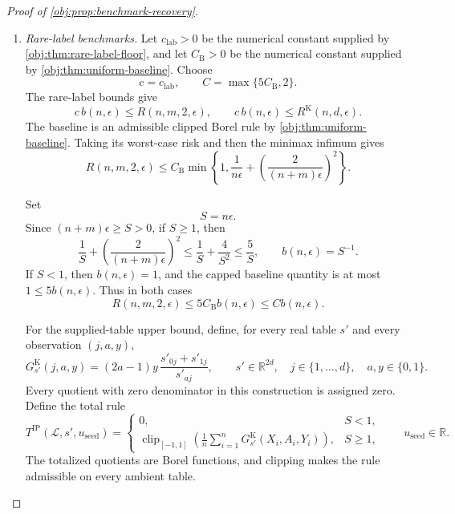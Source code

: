 \documentclass[11pt]{article}
\begin{document}
\begin{proof}[Proof of \cref{obj:prop:benchmark-recovery}]
\begin{enumerate}
\item \emph{Rare-label benchmarks.}
Let \(c_{\mathrm{lab}}>0\) be the numerical constant supplied by
\cref{obj:thm:rare-label-floor}, and let \(C_{\mathrm B}>0\) be the numerical constant supplied by \cref{obj:thm:uniform-baseline}. Choose
\[
c=c_{\mathrm{lab}},
\qquad
C=\max\{5C_{\mathrm B},2\}.
\]
The rare-label bounds give
\[
c\,b(n,\epsilon)\le R(n,m,2,\epsilon),
\qquad
c\,b(n,\epsilon)\le R^{\mathrm K}(n,d,\epsilon).
\]
The baseline is an admissible clipped Borel rule by
\cref{obj:thm:uniform-baseline}. Taking its worst-case risk and then the minimax infimum gives
\[
R(n,m,2,\epsilon)
\le
C_{\mathrm B}\min\left\{
1,\frac1{n\epsilon}
+\left(\frac2{(n+m)\epsilon}\right)^2
\right\}.
\]

Set
\[
S=n\epsilon.
\]
Since \((n+m)\epsilon\ge S>0\), if \(S\ge1\), then
\[
\frac1S+\left(\frac2{(n+m)\epsilon}\right)^2
\le\frac1S+\frac4{S^2}
\le\frac5S,
\qquad
b(n,\epsilon)=S^{-1}.
\]
If \(S<1\), then \(b(n,\epsilon)=1\), and the capped baseline quantity is at most \(1\le5b(n,\epsilon)\). Thus in both cases
\[
R(n,m,2,\epsilon)
\le5C_{\mathrm B}b(n,\epsilon)
\le Cb(n,\epsilon).
\]

For the supplied-table upper bound, define, for every real table \(s'\) and every observation \((j,a,y)\),
\[
G^{\mathrm K}_{s'}(j,a,y)
=(2a-1)y\,\frac{s'_{0j}+s'_{1j}}{s'_{aj}},
\qquad
s'\in\mathbb R^{2d},\quad
j\in\{1,\ldots,d\},\quad a,y\in\{0,1\}.
\]
Every quotient with zero denominator in this construction is assigned zero. Define the total rule
\[
T^{\mathrm{IP}}(\mathcal L,s',u_{\mathrm{seed}})
=
\begin{cases}
0,&S<1,\\[2pt]
\displaystyle
\operatorname{clip}_{[-1,1]}
\left(\frac1n\sum_{i=1}^n
G^{\mathrm K}_{s'}(X_i,A_i,Y_i)\right),&S\ge1,
\end{cases}
\qquad u_{\mathrm{seed}}\in\mathbb R.
\]
The totalized quotients are Borel functions, and clipping makes the rule admissible on every ambient table.


\end{enumerate}
\end{proof}
\end{document}
